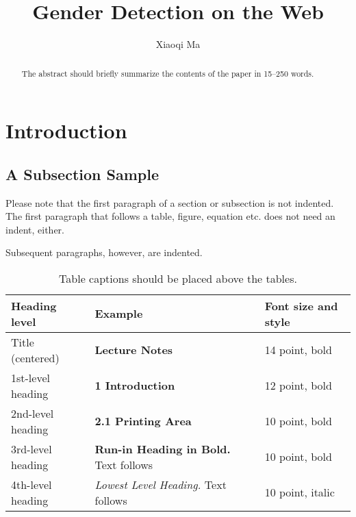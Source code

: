 \documentclass[runningheads]{llncs}
\begin{document}
	\title{Gender Detection on the Web}
	\author{Xiaoqi Ma}
	\maketitle  

	\begin{abstract}
		The abstract should briefly summarize the contents of the paper in
		15--250 words.
		
	\end{abstract}
	\section{Introduction}
	\subsection{A Subsection Sample}

	Please note that the first paragraph of a section or subsection is \cite{karimi2016inferring}
	not indented. The first paragraph that follows a table, figure,
	equation etc. does not need an indent, either.
	
	Subsequent paragraphs, however, are indented.
	
	
	\begin{table}
		\caption{Table captions should be placed above the
			tables.}\label{tab1}
		\begin{tabular}{|l|l|l|}
			\hline
			Heading level &  Example & Font size and style\\
			\hline
			Title (centered) &  {\Large\bfseries Lecture Notes} & 14 point, bold\\
			1st-level heading &  {\large\bfseries 1 Introduction} & 12 point, bold\\
			2nd-level heading & {\bfseries 2.1 Printing Area} & 10 point, bold\\
			3rd-level heading & {\bfseries Run-in Heading in Bold.} Text follows & 10 point, bold\\
			4th-level heading & {\itshape Lowest Level Heading.} Text follows & 10 point, italic\\
			\hline
		\end{tabular}
	\end{table}
	
\end{document}
